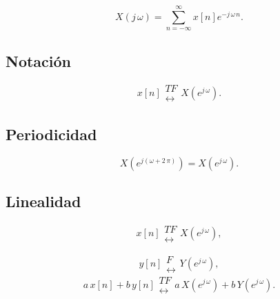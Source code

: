 \begin{equation}
X\left( j \, \omega \right) =
\sum_{n=-\infty }^{\infty }x\left[ n\right]e^{-j \, \omega \, n}.
\end{equation}

\subsection{Notaci\'{o}n}

\begin{equation}
x\left[ n\right] 
\begin{array}{l}
TF \\ 
\leftrightarrow
\end{array}
X\left( e^{j \, \omega }\right) .
\end{equation}

\subsection{Periodicidad}

\begin{equation}
X\left( e^{j\left( \omega +2 \, \pi \right) }\right) =
X\left( e^{j \, \omega}\right).
\end{equation}

\subsection{Linealidad}

\begin{equation}
x\left[ n\right] 
\begin{array}{l}
TF \\ 
\leftrightarrow
\end{array}
X\left( e^{j \, \omega }\right) ,
\end{equation}

\begin{equation}
y\left[ n\right] 
\begin{array}{l}
F \\ 
\leftrightarrow
\end{array}
Y\left( e^{j \, \omega }\right) ,
\end{equation}
\begin{equation}
a \, x\left[ n\right] +b \, y\left[ n\right] 
\begin{array}{l}
TF \\ 
\leftrightarrow
\end{array}
a \, X\left( e^{j \, \omega }\right) +b \, Y\left( e^{j \, \omega }\right) .
\end{equation}

